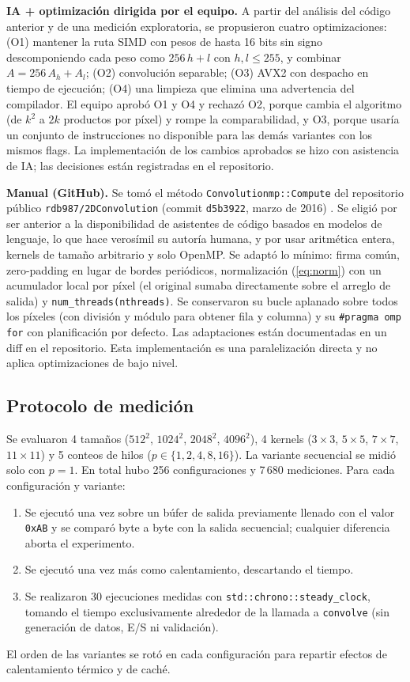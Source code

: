 \documentclass[12pt]{article}
\begin{document}
\textbf{IA + optimización dirigida por el equipo.} A partir del análisis del código anterior y de una medición exploratoria, se propusieron cuatro optimizaciones: (O1) mantener la ruta SIMD con pesos de hasta 16 bits sin signo descomponiendo cada peso como $256\,h + l$ con $h, l \le 255$, y combinar $A = 256\,A_h + A_l$; (O2) convolución separable; (O3) AVX2 con despacho en tiempo de ejecución; (O4) una limpieza que elimina una advertencia del compilador. El equipo aprobó O1 y O4 y rechazó O2, porque cambia el algoritmo (de $k^2$ a $2k$ productos por píxel) y rompe la comparabilidad, y O3, porque usaría un conjunto de instrucciones no disponible para las demás variantes con los mismos flags. La implementación de los cambios aprobados se hizo con asistencia de IA; las decisiones están registradas en el repositorio.

\textbf{Manual (GitHub).} Se tomó el método \texttt{Convolutionmp::Compute} del repositorio público \texttt{rdb987/2DConvolution} (commit \texttt{d5b3922}, marzo de 2016) \cite{rdb987}. Se eligió por ser anterior a la disponibilidad de asistentes de código basados en modelos de lenguaje, lo que hace verosímil su autoría humana, y por usar aritmética entera, kernels de tamaño arbitrario y solo OpenMP. Se adaptó lo mínimo: firma común, zero-padding en lugar de bordes periódicos, normalización (\ref{eq:norm}) con un acumulador local por píxel (el original sumaba directamente sobre el arreglo de salida) y \texttt{num\_threads(nthreads)}. Se conservaron su bucle aplanado sobre todos los píxeles (con división y módulo para obtener fila y columna) y su \texttt{\#pragma omp for} con planificación por defecto. Las adaptaciones están documentadas en un diff en el repositorio. Esta implementación es una paralelización directa y no aplica optimizaciones de bajo nivel.

\subsection{Protocolo de medición}
Se evaluaron 4 tamaños ($512^2$, $1024^2$, $2048^2$, $4096^2$), 4 kernels ($3\times3$, $5\times5$, $7\times7$, $11\times11$) y 5 conteos de hilos ($p \in \{1, 2, 4, 8, 16\}$). La variante secuencial se midió solo con $p = 1$. En total hubo 256 configuraciones y 7\,680 mediciones. Para cada configuración y variante:
\begin{enumerate}
\item Se ejecutó una vez sobre un búfer de salida previamente llenado con el valor \texttt{0xAB} y se comparó byte a byte con la salida secuencial; cualquier diferencia aborta el experimento.
\item Se ejecutó una vez más como calentamiento, descartando el tiempo.
\item Se realizaron 30 ejecuciones medidas con \texttt{std::chrono::steady\_clock}, tomando el tiempo exclusivamente alrededor de la llamada a \texttt{convolve} (sin generación de datos, E/S ni validación).
\end{enumerate}
El orden de las variantes se rotó en cada configuración para repartir efectos de calentamiento térmico y de caché.
\end{document}
